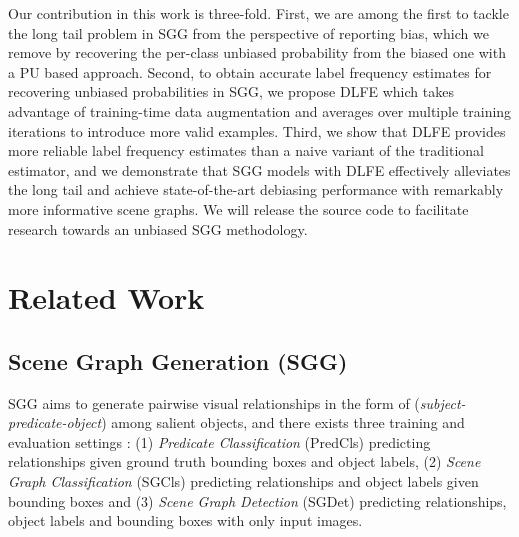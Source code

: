 \documentclass[sigconf]{acmart}
\begin{document}
Our contribution in this work is three-fold. 
First, we are among the first to tackle the long tail problem in SGG from the perspective of reporting bias, which we remove by recovering the per-class unbiased probability from the biased one with a PU based approach.
Second, to obtain accurate label frequency estimates for recovering unbiased probabilities in SGG, we propose DLFE which takes advantage of training-time data augmentation and averages over multiple training iterations to introduce more valid examples.
Third, we show that DLFE provides more reliable label frequency estimates than a naive variant of the traditional estimator, and we demonstrate that SGG models with DLFE effectively alleviates the long tail and achieve state-of-the-art debiasing performance with remarkably more informative scene graphs.
We will release the source code to facilitate research towards an unbiased SGG methodology.

\section{Related Work}
\subsection{Scene Graph Generation (SGG)}
SGG \cite{lu2016visual} aims to generate pairwise visual relationships in the form of (\textit{subject-predicate-object}) among salient objects, and there exists three training and evaluation settings \cite{xu2017scene,zellers2018neural}: (1) \textit{Predicate Classification} (PredCls) predicting relationships given ground truth bounding boxes and object labels, (2) \textit{Scene Graph Classification} (SGCls) predicting relationships and object labels given bounding boxes and (3) \textit{Scene Graph Detection} (SGDet) predicting relationships, object labels and bounding boxes with only input images.
\end{document}
